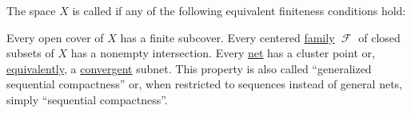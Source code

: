 \begin{definition}\label{def:compact_space}
  The space \( X \) is called  if any of the following equivalent finiteness conditions hold:
  \begin{thmenum}
     Every open cover of \( X \) has a finite subcover.
     Every centered \hyperref[def:centered_family]{family} \( \mscrF \) of closed subsets of \( X \) has a nonempty intersection.
     Every \hyperref[def:topological_net]{net} has a cluster point or, \hyperref[thm:def:net_limit_point/cluster_point_subnet_limit]{equivalently}, a \hyperref[def:net_limit_point]{convergent} subnet. This property is also called \enquote{generalized sequential compactness} or, when restricted to sequences instead of general nets, simply \enquote{sequential compactness}.
  \end{thmenum}
\end{definition}
